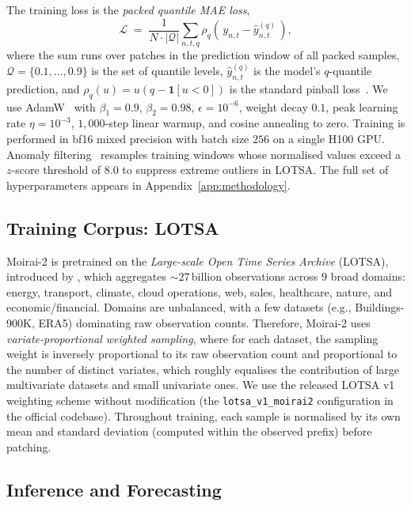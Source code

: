 \documentclass[11pt]{article}
\theoremstyle{plain}
\theoremstyle{definition}
\theoremstyle{remark}
\begin{document}
The training loss is the \emph{packed quantile MAE loss},
\begin{equation}
    \mathcal{L} \;=\; \frac{1}{N \cdot |\mathcal{Q}|} \sum_{n,t,q} \rho_q\!\left(\, y_{n,t} - \hat y_{n,t}^{(q)} \,\right),
    \label{eq:quantile-loss}
\end{equation}
where the sum runs over patches in the prediction window of all packed samples, $\mathcal{Q} = \{0.1, \ldots, 0.9\}$ is the set of quantile levels, $\hat y_{n,t}^{(q)}$ is the model's $q$-quantile prediction, and $\rho_q(u) = u(q - \mathbf{1}[u < 0])$ is the standard pinball loss~\citep{koenker1978regression}. We use AdamW~\citep{loshchilov2019adamw} with $\beta_1 = 0.9$, $\beta_2 = 0.98$, $\epsilon = 10^{-6}$, weight decay $0.1$, peak learning rate $\eta = 10^{-3}$, $1{,}000$-step linear warmup, and cosine annealing to zero. Training is performed in bf16 mixed precision with batch size $256$ on a single H100 GPU. Anomaly filtering~\citep{liu2024moirai2} resamples training windows whose normalised values exceed a $z$-score threshold of $8.0$ to suppress extreme outliers in LOTSA. The full set of hyperparameters appears in Appendix~\ref{app:methodology}.

\subsection{Training Corpus: LOTSA}
\label{sec:lotsa}

Moirai-2 is pretrained on the \emph{Large-scale Open Time Series Archive} (LOTSA), introduced by \citet{woo2024unified}, which aggregates $\sim 27$\,billion observations across $9$ broad domains: energy, transport, climate, cloud operations, web, sales, healthcare, nature, and economic/financial. Domains are unbalanced, with a few datasets (e.g., Buildings-900K, ERA5) dominating raw observation counts. Therefore, Moirai-2 uses \emph{variate-proportional weighted sampling}, where for each dataset, the sampling weight is inversely proportional to its raw observation count and proportional to the number of distinct variates, which roughly equalises the contribution of large multivariate datasets and small univariate ones. We use the released LOTSA v1 weighting scheme without modification (the \texttt{lotsa\_v1\_moirai2} configuration in the official codebase). Throughout training, each sample is normalised by its own mean and standard deviation (computed within the observed prefix) before patching.

\subsection{Inference and Forecasting}
\label{sec:inference}
\end{document}

